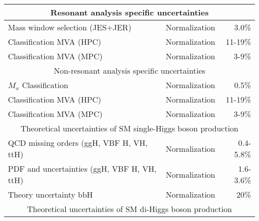 \begin{table}[h]
\begin{tabular}{lrr}
\multicolumn{3}{c}{Resonant analysis specific uncertainties}                                                                                               \\ \hline
\multicolumn{1}{l|}{Mass window selection (JES+JER)}                                      & \multicolumn{1}{r|}{Normalization} & 3.0\%                     \\ \cline{2-2}
\multicolumn{1}{l|}{Classification MVA (HPC)}                                              & \multicolumn{1}{r|}{Normalization} & 11-19\%                   \\ \cline{2-2}
\multicolumn{1}{l|}{Classification MVA (MPC)}                                              & \multicolumn{1}{r|}{Normalization} & 3-9\%                     \\ \hline
\multicolumn{3}{c}{Non-resonant analysis specific uncertainties}                                                                                           \\ \hline
\multicolumn{1}{l|}{$M_{x}$ Classification}                                                & \multicolumn{1}{r|}{Normalization} & 0.5\%                     \\ \cline{2-2}
\multicolumn{1}{l|}{Classification MVA (HPC)}                                              & \multicolumn{1}{r|}{Normalization} & 11-19\%                   \\ \cline{2-2}
\multicolumn{1}{l|}{Classification MVA (MPC)}                                              & \multicolumn{1}{r|}{Normalization} & 3-9\%                     \\ \hline
\multicolumn{3}{c}{Theoretical uncertainties of SM single-Higgs boson production}                                                                          \\ \hline
\multicolumn{1}{l|}{QCD missing orders (ggH, VBF H, VH, ttH)}                             & \multicolumn{1}{r|}{Normalization} & 0.4-5.8\%                 \\ \cline{2-2}
\multicolumn{1}{l|}{PDF and  uncertainties (ggH, VBF H, VH, ttH)}                         & \multicolumn{1}{r|}{Normalization} & 1.6-3.6\%                 \\ \cline{2-2}
\multicolumn{1}{l|}{Theory uncertainty bbH}                                               & \multicolumn{1}{r|}{Normalization} & 20\%                      \\ \hline
\multicolumn{3}{c}{Theoretical uncertainties of SM di-Higgs boson production}                                                                              \\ \hline

\end{tabular}
\end{table}
